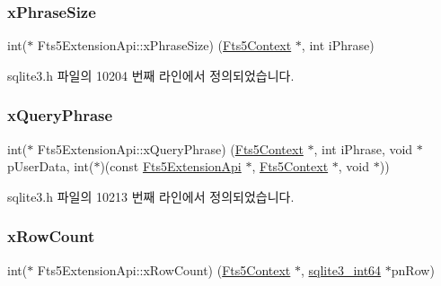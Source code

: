 \mbox{\label{struct_fts5_extension_api_aeda6faa66f47f9116c9ceba882aaedd2}} 
\subsubsection{\texorpdfstring{x\+Phrase\+Size}{xPhraseSize}}
{\footnotesize\ttfamily int($\ast$ Fts5\+Extension\+Api\+::x\+Phrase\+Size) (\hyperlink{sqlite3_8h_a97821b95ebebd43db901977ffd5b26bc}{Fts5\+Context} $\ast$, int i\+Phrase)}



sqlite3.\+h 파일의 10204 번째 라인에서 정의되었습니다.

\mbox{\label{struct_fts5_extension_api_a8f6dcf0a1d246b235f98f5bbb214e28d}} 
\subsubsection{\texorpdfstring{x\+Query\+Phrase}{xQueryPhrase}}
{\footnotesize\ttfamily int($\ast$ Fts5\+Extension\+Api\+::x\+Query\+Phrase) (\hyperlink{sqlite3_8h_a97821b95ebebd43db901977ffd5b26bc}{Fts5\+Context} $\ast$, int i\+Phrase, void $\ast$p\+User\+Data, int($\ast$)(const \hyperlink{struct_fts5_extension_api}{Fts5\+Extension\+Api} $\ast$, \hyperlink{sqlite3_8h_a97821b95ebebd43db901977ffd5b26bc}{Fts5\+Context} $\ast$, void $\ast$))}



sqlite3.\+h 파일의 10213 번째 라인에서 정의되었습니다.

\mbox{\label{struct_fts5_extension_api_ae1eb7ad1d3c131a09376134ecc099568}} 
\subsubsection{\texorpdfstring{x\+Row\+Count}{xRowCount}}
{\footnotesize\ttfamily int($\ast$ Fts5\+Extension\+Api\+::x\+Row\+Count) (\hyperlink{sqlite3_8h_a97821b95ebebd43db901977ffd5b26bc}{Fts5\+Context} $\ast$, \hyperlink{sqlite3_8h_a0a4d3e6c1ad46f90e746b920ab6ca0d2}{sqlite3\+\_\+int64} $\ast$pn\+Row)}



